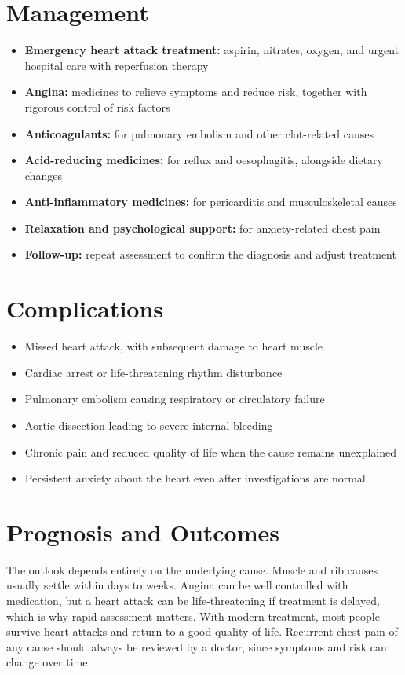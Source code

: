 \section*{Management}
\begin{itemize}
    \item \textbf{Emergency heart attack treatment:} aspirin, nitrates, oxygen, and urgent hospital care with reperfusion therapy
    \item \textbf{Angina:} medicines to relieve symptoms and reduce risk, together with rigorous control of risk factors
    \item \textbf{Anticoagulants:} for pulmonary embolism and other clot-related causes
    \item \textbf{Acid-reducing medicines:} for reflux and oesophagitis, alongside dietary changes
    \item \textbf{Anti-inflammatory medicines:} for pericarditis and musculoskeletal causes
    \item \textbf{Relaxation and psychological support:} for anxiety-related chest pain
    \item \textbf{Follow-up:} repeat assessment to confirm the diagnosis and adjust treatment
\end{itemize}

\section*{Complications}
\begin{itemize}
    \item Missed heart attack, with subsequent damage to heart muscle
    \item Cardiac arrest or life-threatening rhythm disturbance
    \item Pulmonary embolism causing respiratory or circulatory failure
    \item Aortic dissection leading to severe internal bleeding
    \item Chronic pain and reduced quality of life when the cause remains unexplained
    \item Persistent anxiety about the heart even after investigations are normal
\end{itemize}

\section*{Prognosis and Outcomes}
The outlook depends entirely on the underlying cause. Muscle and rib causes usually settle within days to weeks. Angina can be well controlled with medication, but a heart attack can be life-threatening if treatment is delayed, which is why rapid assessment matters. With modern treatment, most people survive heart attacks and return to a good quality of life. Recurrent chest pain of any cause should always be reviewed by a doctor, since symptoms and risk can change over time.

